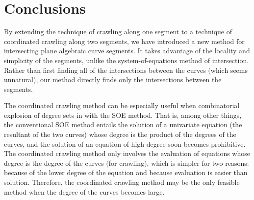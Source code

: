 %
%
%
%


\section{Conclusions}

By extending the technique of crawling along one segment to a technique of 
coordinated crawling along two segments,
we have introduced a new method for intersecting plane algebraic curve segments.
It takes advantage of the locality and simplicity of the segments, unlike the
system-of-equations method of intersection.
Rather than first finding all of the intersections between the curves (which 
seems unnatural), our method directly finds only the intersections between the segments.

The coordinated crawling method can be especially useful when combinatorial explosion
of degree sets in with the SOE method.
That is, among other things, the conventional SOE method entails the solution of a 
univariate equation (the resultant of the two curves) whose degree is the product 
of the degrees of the curves, and the solution of an equation of high degree  
soon becomes prohibitive.
The coordinated crawling method only involves the evaluation of equations whose
degree is the degree of the curves (for crawling), which is simpler for two reasons:
because of the lower degree of the equation and because evaluation
is easier than solution.
Therefore, the coordinated crawling method may be the only feasible method when the
degree of the curves becomes large.

